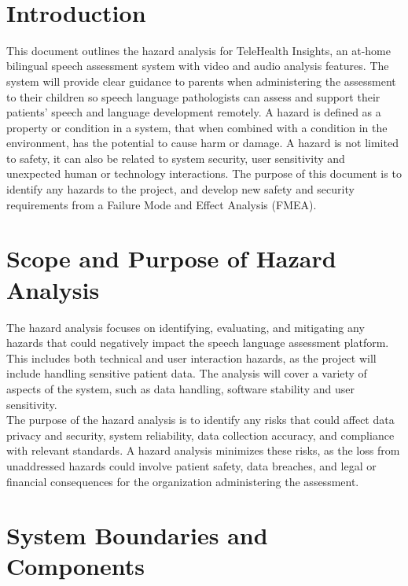 \documentclass{article}
\begin{document}
~\newpage


\section{Introduction}

\hspace{1.5em} This document outlines the hazard analysis for TeleHealth Insights, an at-home bilingual speech 
assessment system with video and audio analysis features. The system will provide clear guidance to
parents when administering the assessment to their children so speech language pathologists can assess and support
their patients' speech and language development remotely. A hazard is defined as a 
property or condition in a system, that when combined with a condition in the environment, has the potential to cause harm or 
damage. A hazard is not limited to safety, it can also be related to system security, user sensitivity and 
unexpected human or technology interactions. The purpose of this document is to identify any hazards to the project, and 
develop new safety and security requirements from a Failure Mode and Effect Analysis (FMEA).

\section{Scope and Purpose of Hazard Analysis}

\hspace{1.5em} The hazard analysis focuses on identifying, evaluating, and mitigating any hazards that could negatively 
impact the speech language assessment platform. This includes both technical and user interaction hazards,
as the project will include handling sensitive patient data. The analysis will cover a variety of aspects of the system, such as 
data handling, software stability and user sensitivity. \\
\indent The purpose of the hazard analysis is to identify any risks that could 
affect data privacy and security, system reliability, data collection accuracy, and compliance with relevant standards. A 
hazard analysis minimizes these risks, as the loss from unaddressed hazards could involve patient safety, data breaches, 
and legal or financial consequences for the organization administering the assessment.

\section{System Boundaries and Components}
\end{document}
